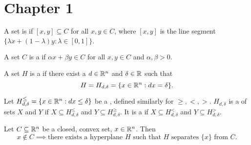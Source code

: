 \documentclass{exam}
\begin{document}
    \section{Chapter 1}\label{sec:chapter1}
    
    \begin{define}
        A set is  if $[x,y] \subseteq C$ for all $x,y \in C$, where $[x,y]$ is the line segment $\{ \lambda x + (1-\lambda)y : \lambda \in [0,1] \}$.
    \end{define}
    \begin{define}
        A set $C$ is a  if $\alpha x + \beta y \in C$ for all $x,y \in C$ and $\alpha, \beta >0$.
    \end{define}
    \begin{define}
        A set $H$ is a  if there exist a $d \in \mathbb{R}^n$ and $\delta \in \mathbb{R}$ such that
        \[
            H = H_{d, \delta} = \{ x \in \mathbb{R}^n : d x = \delta \}.
        \]
    \end{define}
    \begin{define}
        Let $H_{d,\delta}^{\le} = \{ x \in \mathbb{R}^n : dx \le \delta \}$ be a , defined similarly for $\ge, <, >$.
        $H_{d, \delta}$ is a  of sets $X$ and $Y$ if $X \subseteq H_{d,\delta}^\le$ and $Y \subseteq H_{d,\delta}^\ge$.
        It is a  if $X \subseteq H_{d,\delta}^<$ and $Y \subseteq H_{d,\delta}^>$.
    \end{define}
    \begin{theorem}
        Let $C \subseteq \mathbb{R}^n$ be a closed, convex set, $x \in \mathbb{R}^n$.
        Then
        \[
            x \not \in C \implies \text{there exists a hyperplane $H$ such that $H$ separates $\{x\}$ from $C$}.
        \]
    \end{theorem}
\end{document}
